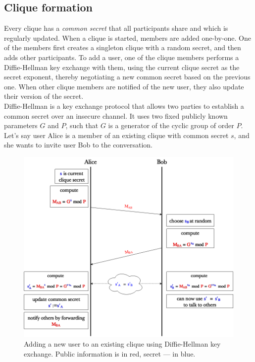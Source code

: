\documentclass[a4paper, twoside, 12pt]{report}
\begin{document}
\subsection{Clique formation}
\label{subsec:prep.formation}
Every clique has a \emph{common secret} that all participants share and which is regularly updated. When a clique is started, members are added one-by-one. One of the members first creates a singleton clique with a random secret, and then adds other participants. To add a user, one of the clique members performs a Diffie-Hellman key exchange \cite{diffie1976new} with them, using the current clique secret as the secret exponent, thereby negotiating a new common secret based on the previous one. When other clique members are notified of the new user, they also update their version of the secret. \\

Diffie-Hellman is a key exchange protocol that allows two parties to establish a common secret over an insecure channel. It uses two fixed publicly known parameters $G$ and $P$, such that $G$ is a generator of the cyclic group of order $P$. Let's say user Alice is a member of an existing clique with common secret $s$, and she wants to invite user Bob to the conversation. 
\begin{figure}[h]
    \captionsetup{width=0.8\textwidth}
    \centering
    \includegraphics[width = 0.85 \linewidth]{pics/DH.png}
    \caption{Adding a new user to an existing clique using Diffie-Hellman key exchange. Public information is in {\color{red}red}, secret --- in {\color{blue}blue}.}
    \label{fig:DH}
\end{figure}
\end{document}
